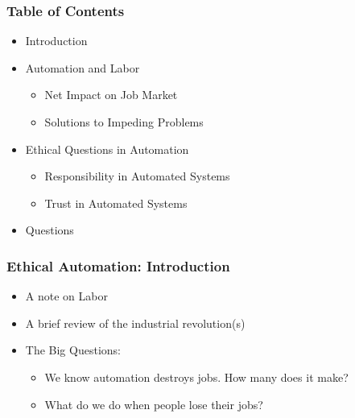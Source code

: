



\begin{frame}
  \frametitle{ Table of Contents}
  \begin{itemize}
  \item Introduction
  \item Automation and Labor
    \begin{itemize}
    \item Net Impact on Job Market
    \item Solutions to Impeding Problems
    \end{itemize}
  \item Ethical Questions in Automation
    \begin{itemize}
    \item Responsibility in Automated Systems
    \item Trust in Automated Systems
    \end{itemize}
  \item Questions
  \end{itemize}
\end{frame}


\begin{frame}
  \frametitle{ Ethical Automation: Introduction}
  \begin{itemize}
  \item A note on Labor
  \item A brief review of the industrial revolution(s)
  \item The Big Questions:
    \begin{itemize}
    \item We know automation destroys jobs.  How many does it make?
    \item What do we do when people lose their jobs?
    \end{itemize}
  \end{itemize}
\end{frame}


